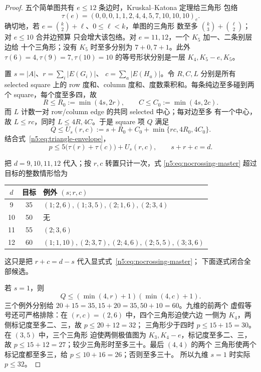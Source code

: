\begin{proof}
五个简单图共有 \(e\le12\) 条边时，Kruskal--Katona 定理给三角形
包络
\begin{equation}\label{n5:eq:triangle-envelope}
 \tau(e)=(0,0,0,1,1,2,4,4,5,7,10,10,10)_e.
\end{equation}
确切地，若 \(e=\binom{k}{2}+\ell\)、\(0\le\ell<k\)，单图的三角形
数至多 \(\binom{k}{3}+\binom{\ell}{2}\)；对 \(e\le10\) 合并边预算
只会增大该包络。对 \(e=11,12\)，一个 \(K_5\) 加一、二条别层边给
十个三角形；没有 \(K_5\) 时至多分别为 \(7+0,7+1\)。此外
\(\tau(6)=4,\tau(9)=7,\tau(10)=10\) 的等号形状分别是一层
\(K_4,K_5-e,K_5\)。

置 \(s=|A|\)、\(r=\sum_i|E(G_i)|\)、
\(c=\sum_a|E(H_a)|\)。令 \(R,C,L\) 分别是所有 selected square
上的 row 度和、column 度和、度数乘积和。每条纯边至多碰到两个
square，每个度至多四，故
\[
R\le R_0:=\min(4s,2r),\qquad
C\le C_0:=\min(4s,2c).
\]
而 \(L\) 计数一对 row/column edge 的共同 selected 中心；每对边至多
有一个中心，故 \(L\le rc\)，同时 \(L\le4R,4C\)。于是 square 项
\(Q\) 满足
\begin{equation}\label{n5:eq:universal-square-bound}
 Q\le U_s(r,c):=
 s+R_0+C_0+\min\{rc,4R_0,4C_0\}.
\end{equation}
结合式~\eqref{n5:eq:triangle-envelope}，
\begin{equation}\label{n5:eq:nocrossing-master}
 p\le5\bigl(\tau(r)+\tau(c)\bigr)+U_s(r,c),
 \qquad s+r+c=d.
\end{equation}

把 \(d=9,10,11,12\) 代入；按 \(r,c\) 转置只计一次，式
\eqref{n5:eq:nocrossing-master} 超过目标的整数情形恰为
\begin{center}
\begin{tabular}{@{}ccl@{}}
\toprule
\(d\)&目标&例外 \((s;r,c)\)\\ \midrule
9&35&\((1;2,6),(1;3,5),(2;1,6),(2;3,4)\)\\
10&50&无\\
11&55&\((2;3,6)\)\\
12&60&\((1;1,10),(2;3,7),(2;4,6),(2;5,5),(3;3,6)\)\\
\bottomrule
\end{tabular}
\end{center}
这只是把 \(r+c=d-s\) 代入显式式~\eqref{n5:eq:nocrossing-master}；
下面逐式闭合全部候选。

若 \(s=1\)，则
\begin{equation}\label{n5:eq:one-square-bound}
 Q\le(\min(4,r)+1)(\min(4,c)+1).
\end{equation}
三个例外分别给 \(20+15=35,15+20=35,50+10=60\)。九维的前两个
虚假等号还可严格排除：在 \((r,c)=(2,6)\) 中，四个三角形迫使六边
一侧为 \(K_4\)，两侧标记度至多二、三，故 \(p\le20+12=32\)；
三角形少于四时 \(p\le15+15=30\)。在 \((3,5)\) 中，三个三角形
迫使两侧极值图为 \(K_3,K_4-e\)，标记度至多二、三，故
\(p\le15+12=27\)；较少三角形时至多三十。最后 \((4,4)\) 的两个
三角形使两个标记度都至多三，给 \(p\le10+16=26\)；否则至多三十。
所以九维 \(s=1\) 时实际 \(p\le32\)。


\end{proof}
